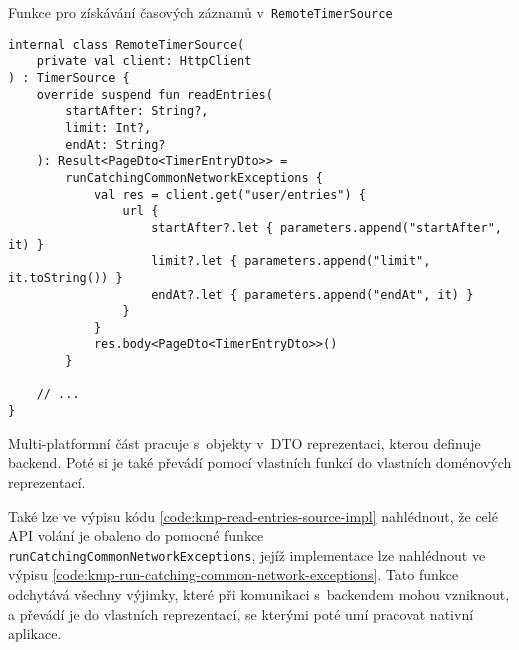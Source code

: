 \begin{listing}
\caption{Funkce pro získávání časových záznamů v~\texttt{RemoteTimerSource}}\label{code:kmp-read-entries-source-impl}
\begin{verbatim}
internal class RemoteTimerSource(
    private val client: HttpClient
) : TimerSource {
    override suspend fun readEntries(
        startAfter: String?,
        limit: Int?,
        endAt: String?
    ): Result<PageDto<TimerEntryDto>> =
        runCatchingCommonNetworkExceptions {
            val res = client.get("user/entries") {
                url {
                    startAfter?.let { parameters.append("startAfter", it) }
                    limit?.let { parameters.append("limit", it.toString()) }
                    endAt?.let { parameters.append("endAt", it) }
                }
            }
            res.body<PageDto<TimerEntryDto>>()
        }
        
    // ...
}
\end{verbatim}
\end{listing}

Multi-platformní část pracuje s~objekty v~DTO reprezentaci, kterou definuje backend. Poté si je také převádí pomocí vlastních funkcí do vlastních doménových reprezentací.

Také lze ve výpisu kódu \ref{code:kmp-read-entries-source-impl} nahlédnout, že celé API volání je obaleno do pomocné funkce \texttt{runCatchingCommonNetworkExceptions}, jejíž implementace lze nahlédnout ve výpisu \ref{code:kmp-run-catching-common-network-exceptions}. Tato funkce odchytává všechny výjimky, které při komunikaci s~backendem mohou vzniknout, a převádí je do vlastních reprezentací, se kterými poté umí pracovat nativní aplikace.

